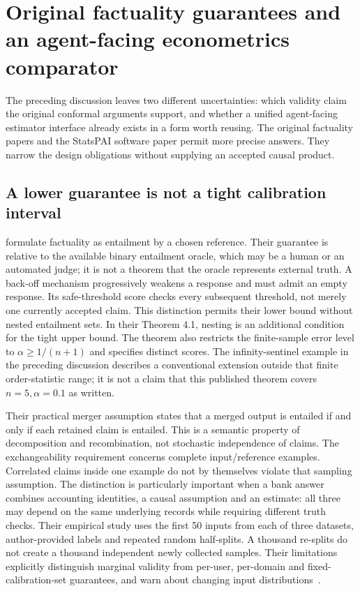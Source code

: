 \section{Original factuality guarantees and an agent-facing econometrics comparator}
\label{exec23:proof-scope}
The preceding discussion leaves two different uncertainties: which validity
claim the original conformal arguments support, and whether a unified
agent-facing estimator interface already exists in a form worth reusing.
The original factuality papers and the StatsPAI software paper permit more
precise answers. They narrow the design obligations without supplying an
accepted causal product.

\subsection{A lower guarantee is not a tight calibration interval}
\label{exec23:proof-lower}
\citet{exec23_mohri_factuality} formulate factuality as entailment by a chosen
reference. Their guarantee is relative to the available binary entailment
oracle, which may be a human or an automated judge; it is not a theorem that
the oracle represents external truth. A back-off mechanism progressively
weakens a response and must admit an empty response. Its safe-threshold
score checks every subsequent threshold, not merely one currently accepted
claim. This distinction permits their lower bound without nested entailment
sets. In their Theorem 4.1, nesting is an additional condition for the tight
upper bound. The theorem also restricts the finite-sample error level to
$\alpha\geq 1/(n+1)$ and specifies distinct scores. The infinity-sentinel
example in the preceding discussion describes a conventional extension
outside that finite order-statistic range; it is not a claim that this
published theorem covers $n=5,\alpha=0.1$ as written.

Their practical merger assumption states that a merged output is entailed
if and only if each retained claim is entailed. This is a semantic property
of decomposition and recombination, not stochastic independence of claims.
The exchangeability requirement concerns complete input/reference examples.
Correlated claims inside one example do not by themselves violate that
sampling assumption. The distinction is particularly important when a bank
answer combines accounting identities, a causal assumption and an estimate:
all three may depend on the same underlying records while requiring different
truth checks. Their empirical study uses the first 50 inputs from each of
three datasets, author-provided labels and repeated random half-splits. A
thousand re-splits do not create a thousand independent newly collected
samples. Their limitations explicitly distinguish marginal validity from
per-user, per-domain and fixed-calibration-set guarantees, and warn about
changing input distributions~\citep{exec23_mohri_factuality}.

